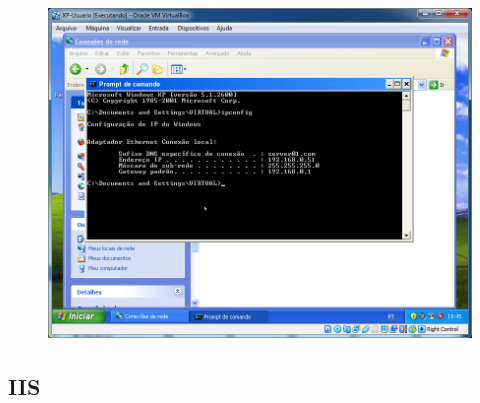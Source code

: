 \documentclass[10pt]{article}
\begin{document}
\begin{figure}[H]
    \centering
    \caption{}
    \label{fig:5326}
    \includegraphics[width=\linewidth]{images/windows_server/dhcp/028.png}
\end{figure}

\subsection{IIS}
\end{document}
